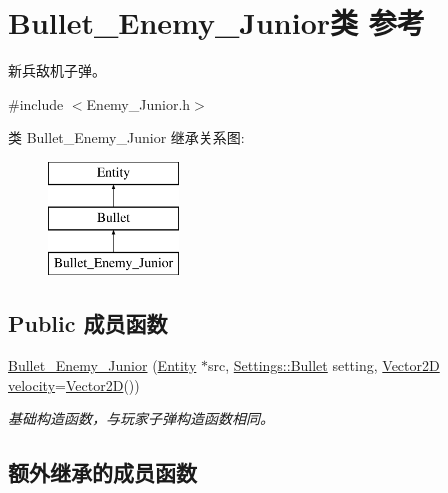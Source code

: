 \hypertarget{class_bullet___enemy___junior}{}\section{Bullet\+\_\+\+Enemy\+\_\+\+Junior类 参考}
\label{class_bullet___enemy___junior}


新兵敌机子弹。  




{\ttfamily \#include $<$Enemy\+\_\+\+Junior.\+h$>$}

类 Bullet\+\_\+\+Enemy\+\_\+\+Junior 继承关系图\+:\begin{figure}[H]
\begin{center}
\leavevmode
\includegraphics[height=3.000000cm]{class_bullet___enemy___junior}
\end{center}
\end{figure}
\subsection*{Public 成员函数}
\begin{DoxyCompactItemize}
\item 
\mbox{\label{class_bullet___enemy___junior_a78eb487c660fab5536d868d7a61664eb}} 
\hyperlink{class_bullet___enemy___junior_a78eb487c660fab5536d868d7a61664eb}{Bullet\+\_\+\+Enemy\+\_\+\+Junior} (\hyperlink{class_entity}{Entity} $\ast$src, \hyperlink{struct_settings_1_1_bullet}{Settings\+::\+Bullet} setting, \hyperlink{structbasic__vector2_d}{Vector2D} \hyperlink{class_entity_a386d25b56772b8913eb3e5adc636f6e0}{velocity}=\hyperlink{structbasic__vector2_d}{Vector2D}())
\begin{DoxyCompactList}\small\item\em 基础构造函数，与玩家子弹构造函数相同。 \end{DoxyCompactList}\end{DoxyCompactItemize}
\subsection*{额外继承的成员函数}


